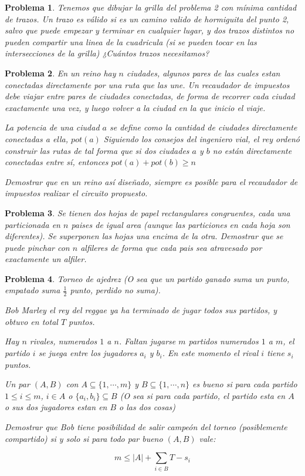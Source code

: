 \documentclass{article}
\newtheorem{problema}{{\sc Problema}}
\begin{document}
\begin{problema} 
Tenemos que dibujar la grilla del problema 2 con mínima cantidad de trazos. Un trazo es válido si es un camino valido de hormiguita del punto 2,
salvo que puede empezar y terminar en cualquier lugar, y dos trazos distintos no pueden compartir una linea de la cuadricula (si se pueden tocar
en las intersecciones de la grilla) ¿Cuántos trazos necesitamos?
\end{problema}

\begin{problema} 
En un reino hay $n$ ciudades, algunos pares de las cuales estan conectadas directamente por una ruta que las une.
Un recaudador de impuestos debe viajar entre pares de ciudades conectadas, de forma de recorrer cada ciudad exactamente una vez, y luego volver a la ciudad en la que inicio el viaje.

La potencia de una ciudad $a$ se define como la cantidad de ciudades directamente conectadas a ella, $pot(a)$
Siguiendo los consejos del ingeniero vial, el rey ordenó construir las rutas de tal forma que si dos ciudades $a$ y $b$ no están directamente conectadas entre sí, entonces $pot(a) + pot(b) \geq n$

Demostrar que en un reino así diseñado, siempre es posible para el recaudador de impuestos realizar el circuito propuesto.
\end{problema}

\begin{problema} 
Se tienen dos hojas de papel rectangulares congruentes, cada una particionada en $n$ paises de igual area (aunque las particiones en cada hoja
son diferentes). Se superponen las hojas una encima de la otra. Demostrar que se puede pinchar con $n$ alfileres de forma que cada pais sea
atravesado por exactamente un alfiler.
\end{problema}

\begin{problema}
Torneo de ajedrez (O sea que un partido ganado suma un punto, empatado suma $\frac{1}{2}$ punto, perdido no suma). 

Bob Marley el rey del reggae ya ha terminado de jugar todos sus partidos, y obtuvo en total $T$ puntos.

Hay $n$ rivales, numerados $1$ a $n$. Faltan jugarse $m$ partidos numerados $1$ a $m$, el partido $i$ se juega entre los jugadores $a_i$ y $b_i$.
En este momento el rival $i$ tiene $s_i$ puntos.

Un par $(A,B)$ con $A \subseteq \{1,\cdots, m \}$ y $B \subseteq \{1, \cdots, n \}$ es bueno si para cada partido $1 \leq i \leq m$,
$i \in A$ o $\{ a_i, b_i \} \subseteq B$ (O sea si para cada partido, el partido esta en $A$ o sus dos jugadores estan en $B$ o las dos cosas)

Demostrar que Bob tiene posibilidad de salir campeón del torneo (posiblemente compartido) si y solo si para todo par bueno $(A,B)$ vale:

$$m \leq |A| + \sum_{i \in B}{T - s_i}$$

\end{problema}
\end{document}
